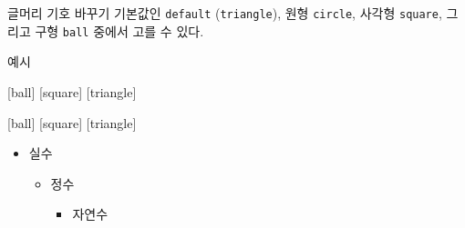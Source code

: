 \documentclass[compress]{beamer}
\begin{document}
\begin{frame}[fragile=singleslide]{글머리 기호 바꾸기}
  기본값인 \verb/default/ (\verb/triangle/), 원형 \verb/circle/, 사각형
  \verb/square/, 그리고 구형 \verb/ball/ 중에서 고를 수 있다.
  \vpad
  \begin{exampleblock}{예시}
    \begin{latexcode}
      [ball]
      [square]
      [triangle]
    \end{latexcode}
    [ball]
    [square]
    [triangle]
    \begin{itemize}
      \item 실수
        \begin{itemize}
          \item 정수
            \begin{itemize}
              \item 자연수
            \end{itemize}
        \end{itemize}
    \end{itemize}
  \end{exampleblock}
\end{frame}
\end{document}
